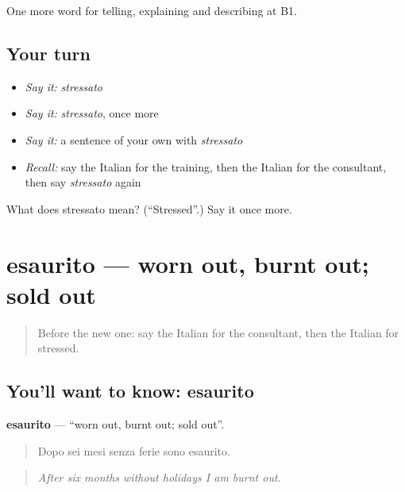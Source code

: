 \begin{grammarlens}[title={What you've built}]
One more word for telling, explaining and describing at B1.
\end{grammarlens}

\subsection*{Your turn}
\begin{itemize}
\raggedright
  \item \emph{Say it:} \emph{stressato}
  \item \emph{Say it:} \emph{stressato}, once more
  \item \emph{Say it:} a sentence of your own with \emph{stressato}
  \item \emph{Recall:} say the Italian for the training, then the Italian for the consultant, then say \emph{stressato} again
\end{itemize}

\begin{tcolorbox}[breakable,colback=teal!4,colframe=teal!35!black,title={Before you move on}]
What does stressato mean? (\textquotedblleft{}Stressed\textquotedblright{}.) Say it once more.
\end{tcolorbox}
\section[esaurito]{esaurito — worn out, burnt out; sold out}

\label{lesson:IT-C362-esaurito}



\begin{quote}
Before the new one: say the Italian for the consultant, then the Italian for stressed.
\end{quote}

\subsection*{You'll want to know: esaurito}
\textbf{esaurito} — \textquotedblleft{}worn out, burnt out; sold out\textquotedblright{}.

\begin{quote}
Dopo sei mesi senza ferie sono esaurito.
\end{quote}

\begin{quote}
\emph{After six months without holidays I am burnt out.}
\end{quote}


